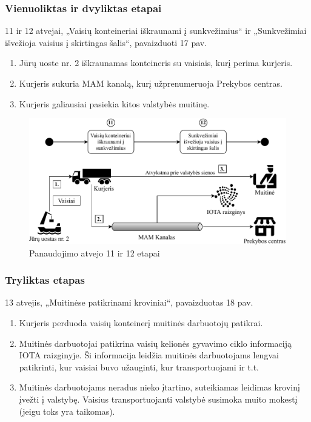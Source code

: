 
\subsubsection{Vienuoliktas ir dvyliktas etapai}

11 ir 12 atvejai, „Vaisių konteineriai iškraunami į sunkvežimius“ ir „Sunkvežimiai išvežioja vaisius į skirtingas šalis“, pavaizduoti 17 pav.
\begin{enumerate}
    \item Jūrų uoste nr. 2 iškraunamas konteineris su vaisiais, kurį perima kurjeris.
    \item Kurjeris sukuria MAM kanalą, kurį užprenumeruoja Prekybos centras.
    \item Kurjeris galiausiai pasiekia kitos valstybės muitinę.
\end{enumerate}

\begin{figure}[H]
    \centering
    \includegraphics[scale=0.7]{images/iota-usecase-11-12}
    \caption{Panaudojimo atvejo 11 ir 12 etapai}
\end{figure}




\subsubsection{Tryliktas etapas}

13 atvejis, „Muitinėse patikrinami kroviniai“, pavaizduotas 18 pav.
\begin{enumerate}
    \item Kurjeris perduoda vaisių konteinerį muitinės darbuotojų patikrai.
    \item Muitinės darbuotojai patikrina vaisių kelionės gyvavimo ciklo informaciją IOTA raizginyje. Ši informacija leidžia muitinės darbuotojams lengvai patikrinti, kur vaisiai buvo užauginti, kur transportuojami ir t.t.
    \item Muitinės darbuotojams neradus nieko įtartino, suteikiamas leidimas krovinį įvežti į valstybę. Vaisius transportuojanti valstybė susimoka muito mokestį (jeigu toks yra taikomas).
\end{enumerate}

